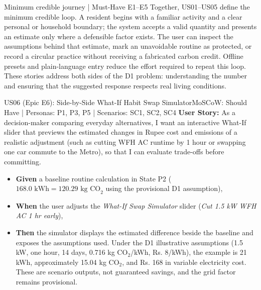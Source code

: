 \documentclass[12pt,a4paper]{article}
\begin{document}
\begin{insightbox}{Minimum credible journey | Must-Have E1--E5}
Together, US01--US05 define the minimum credible loop. A resident begins with a familiar activity and a clear personal or household boundary; the system accepts a valid quantity and presents an estimate only where a defensible factor exists. The user can inspect the assumptions behind that estimate, mark an unavoidable routine as protected, or record a circular practice without receiving a fabricated carbon credit. Offline presets and plain-language entry reduce the effort required to repeat this loop. These stories address both sides of the D1 problem: understanding the number and ensuring that the suggested response respects real living conditions.
\end{insightbox}

\begin{storybox}{US06 (Epic E6): Side-by-Side What-If Habit Swap Simulator}{MoSCoW: Should Have | Personas: P1, P3, P5 | Scenarios: SC1, SC2, SC4}
\textbf{User Story:} As a decision-maker comparing everyday alternatives, I want an interactive What-If slider that previews the estimated changes in Rupee cost and emissions of a realistic adjustment (such as cutting WFH AC runtime by 1 hour or swapping one car commute to the Metro), so that I can evaluate trade-offs before committing.
\begin{itemize}
    \item \textbf{Given} a baseline routine calculation in State P2 ($168.0\text{ kWh} = 120.29\text{ kg CO}_2$ using the provisional D1 assumption),
    \item \textbf{When} the user adjusts the \textit{What-If Swap Simulator} slider (\textit{Cut 1.5 kW WFH AC 1 hr early}),
    \item \textbf{Then} the simulator displays the estimated difference beside the baseline and exposes the assumptions used. Under the D1 illustrative assumptions (1.5 kW, one hour, 14 days, 0.716 kg CO$_2$/kWh, Rs. 8/kWh), the example is 21 kWh, approximately 15.04 kg CO$_2$, and Rs. 168 in variable electricity cost. These are scenario outputs, not guaranteed savings, and the grid factor remains provisional.
\end{itemize}
\end{storybox}
\end{document}
